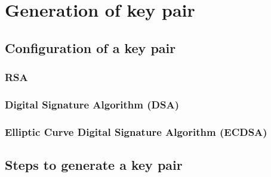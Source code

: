 \chapter{Generation of key pair}

\section{Configuration of a key pair}
\subsection{RSA}
\subsection{Digital Signature Algorithm (DSA)}
\subsection{Elliptic Curve Digital Signature Algorithm (ECDSA)}

\section{Steps to generate a key pair}